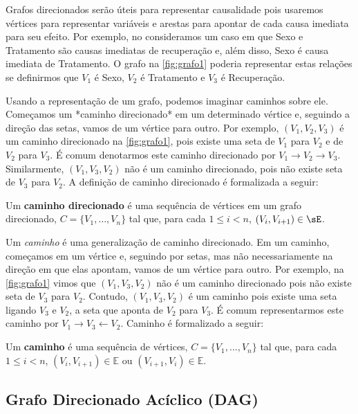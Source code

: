 Grafos direcionados serão úteis para 
representar causalidade pois 
usaremos vértices para representar variáveis e
arestas para apontar de 
cada causa imediata para seu efeito.
Por exemplo, no 
consideramos um caso em que Sexo e Tratamento são
causas imediatas de recuperação e, além disso,
Sexo é causa imediata de Tratamento.
O grafo na \cref{fig:grafo1} poderia
representar estas relações se definirmos que
$V_1$ é Sexo, $V_2$ é Tratamento e 
$V_3$ é Recuperação.

Usando a representação de um grafo,
podemos imaginar caminhos sobre ele.
Começamos um *caminho direcionado* 
em um determinado vértice e, 
seguindo a direção das setas, 
vamos de um vértice para outro.
Por exemplo, $(V_1, V_2, V_3)$ é
um caminho direcionado na 
\cref{fig:grafo1}, pois existe
uma seta de $V_1$ para $V_2$ e
de $V_2$ para $V_3$.
É comum denotarmos este caminho direcionado por
$V_1 \rightarrow V_2 \rightarrow V_3$.
Similarmente, $(V_1, V_3, V_2)$ não é
um caminho direcionado, pois
não existe seta de $V_3$ para $V_2$.
A definição de caminho direcionado é
formalizada a seguir:

\begin{definition}
 \label{lem:caminhodir}
 Um \textbf{caminho direcionado} é 
 uma sequência de vértices em
 um grafo direcionado,
 $C = \{V_1, \ldots, V_n\}$ tal que, 
 para cada $1 \leq i < n$,
 $(V_i, V_{i+1}) \in \sE$.
\end{definition}

Um \textit{caminho} é uma generalização 
de caminho direcionado.
Em um caminho, começamos em um vértice e,
seguindo por setas, mas 
não necessariamente na direção 
em que elas apontam, vamos
de um vértice para outro.
Por exemplo, na \cref{fig:grafo1}
vimos que $(V_1, V_3, V_2)$ não é um 
caminho direcionado pois não existe seta de $V_3$ para $V_2$.
Contudo, $(V_1, V_3, V_2)$ é um caminho pois
existe uma seta ligando $V_3$ e $V_2$,
a seta que aponta de $V_2$ para $V_3$.
É comum representarmos este caminho por
$V_1 \rightarrow V_3 \leftarrow V_2$.
Caminho é formalizado a seguir:

\begin{definition}
 \label{def:caminho}
 Um \textbf{caminho} é uma sequência de vértices,
 $C = \{V_1, \ldots, V_n\}$ tal que, 
 para cada $1 \leq i < n$,
 $(V_i, V_{i+1}) \in \mathbb{E}$ ou 
 $(V_{i+1}, V_{i}) \in \mathbb{E}$. 
\end{definition}

\subsection{Grafo Direcionado Acíclico (DAG)}

